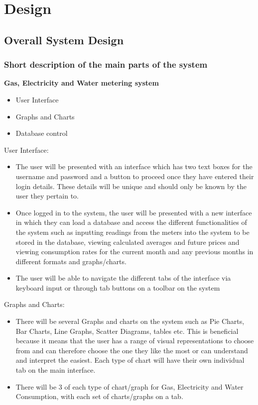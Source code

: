 \chapter{Design}

\section{Overall System Design}

\subsection{Short description of the main parts of the system}
\textbf{Gas, Electricity and Water metering system}
\begin{itemize}
\item{User Interface}
\item{Graphs and Charts}
\item{Database control}
\end{itemize}
User Interface:
\begin{itemize}
\item{The user will be presented with an interface which has two text boxes for the username and password and a button to proceed once they have entered their login details. These details will be unique and should only be known by the user they pertain to.}
\item{Once logged in to the system, the user will be presented with a new interface in which they can load a database and access the different functionalities of the system such as inputting readings from the meters into the system to be stored in the database, viewing calculated averages and future prices and viewing consumption rates for the current month and any previous months in different formats and graphs/charts.}
\item{The user will be able to navigate the different tabs of the interface via keyboard input or through tab buttons on a toolbar on the system}
\end{itemize}

Graphs and Charts:
\begin{itemize}
\item{There will be several Graphs and charts on the system such as Pie Charts, Bar Charts, Line Graphs, Scatter Diagrams, tables etc. This is beneficial because it means that the user has a range of visual representations to choose from and can therefore choose the one they like the most or can understand and interpret the easiest. Each type of chart will have their own individual tab on the main interface.}
\item{There will be 3 of each type of chart/graph for Gas, Electricity and Water Consumption, with each set of charts/graphs on a tab.}
\end{itemize}

